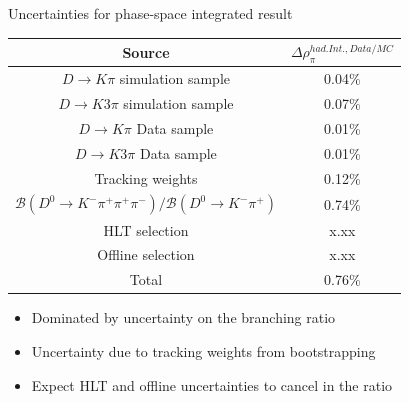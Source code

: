 \documentclass[xcolor={dvipsnames}]{beamer}
\begin{document}
\begin{frame}{Uncertainties for phase-space integrated result}
  \begin{table}[]
    \centering
    \begin{tabular}{cc}
      \toprule
      Source & $\Delta \rho^{had.Int.,Data/MC}_{\pi}$\\
      \midrule
      $D\to K\pi$ simulation sample & 0.04\% \\
      $D\to K3\pi$ simulation sample & 0.07\% \\
      $D\to K\pi$ Data sample & 0.01\% \\
      $D\to K3\pi$ Data sample & 0.01\% \\
      Tracking weights & 0.12\%\\
      $\mathcal{B}(D^0\to K^-\pi^+\pi^+\pi^-)/\mathcal{B}(D^0\to K^-\pi^+)$ & 0.74\%\\
      HLT selection & x.xx\\
      Offline selection & x.xx\\
      \midrule
      Total & 0.76\%\\
      \bottomrule
    \end{tabular}
  \end{table}
  \begin{itemize}
  \item Dominated by uncertainty on the branching ratio
  \item Uncertainty due to tracking weights from bootstrapping
  \item Expect HLT and offline uncertainties to cancel in the ratio
  \end{itemize}
\end{frame}
\end{document}
